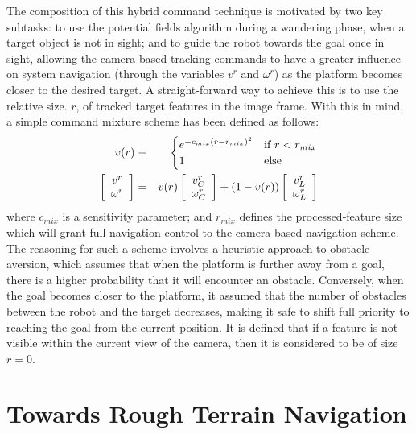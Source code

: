 			The composition of this hybrid command technique is motivated by two key subtasks: to use the potential fields algorithm during a wandering phase, when a target object is not in sight; and to guide the robot towards the goal once in sight, allowing the camera-based tracking commands to have a greater influence on system navigation (through the variables $v^{r}$ and $\omega^{r}$) as the platform becomes closer to the desired target. A straight-forward way to achieve this is to use the relative size. $r$, of tracked target features in the image frame. With this in mind, a simple command mixture scheme has been defined as follows:
			\begin{eqnarray}
				v(r) &\equiv&
				\begin{cases}
				e^{ -c_{mix} \left( r - r_{mix}\right)^{2} } 	& \text{if } r < r_{mix}	\\
				1											& \text{else}
				\end{cases}
								\nonumber \\
						\left[\begin{array}{c} v^{r} 	\\ \omega^{r} 		\end{array} \right] &=& 	
				v(r)	\left[\begin{array}{c} v^{r}_{C}\\ \omega^{r}_{C} 	\end{array} \right] + 
				(1-v(r))\left[\begin{array}{c} v^{r}_{L}\\ \omega^{r}_{L} 	\end{array} \right] 
			\end{eqnarray}
			where $c_{mix}$ is a sensitivity parameter; and $r_{mix}$ defines the processed-feature size which will grant full navigation control to the camera-based navigation scheme. The reasoning for such a scheme involves a heuristic approach to obstacle aversion, which assumes that when the platform is further away from a goal, there is a higher probability that it will encounter an obstacle. Conversely, when the goal becomes closer to the platform, it assumed that the number of obstacles between the robot and the target decreases, making it safe to shift full priority to reaching the goal from the current position. It is defined that if a feature is not visible within the current view of the camera, then it is considered to be of size $r=0$.


	\section{Towards Rough Terrain Navigation}


